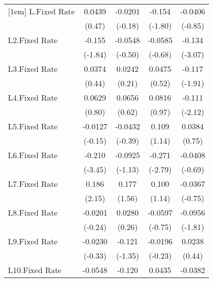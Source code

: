 {\begin{longtable}{l*{4}{c}}
[1em]
L.Fixed Rate    &   0.0439         &  -0.0201         &   -0.154         &  -0.0406         \\
                &   (0.47)         &  (-0.18)         &  (-1.80)         &  (-0.85)         \\
[1em]
L2.Fixed Rate   &   -0.155         &  -0.0548         &  -0.0585         &   -0.134\sym{**} \\
                &  (-1.84)         &  (-0.50)         &  (-0.68)         &  (-3.07)         \\
[1em]
L3.Fixed Rate   &   0.0374         &   0.0242         &   0.0475         &   -0.117         \\
                &   (0.44)         &   (0.21)         &   (0.52)         &  (-1.91)         \\
[1em]
L4.Fixed Rate   &   0.0629         &   0.0656         &   0.0816         &   -0.111\sym{*}  \\
                &   (0.80)         &   (0.62)         &   (0.97)         &  (-2.12)         \\
[1em]
L5.Fixed Rate   &  -0.0127         &  -0.0432         &    0.109         &   0.0384         \\
                &  (-0.15)         &  (-0.39)         &   (1.14)         &   (0.75)         \\
[1em]
L6.Fixed Rate   &   -0.210\sym{***}&  -0.0925         &   -0.271\sym{**} &  -0.0408         \\
                &  (-3.45)         &  (-1.13)         &  (-2.79)         &  (-0.69)         \\
[1em]
L7.Fixed Rate   &    0.186\sym{*}  &    0.177         &    0.100         &  -0.0367         \\
                &   (2.15)         &   (1.56)         &   (1.14)         &  (-0.75)         \\
[1em]
L8.Fixed Rate   &  -0.0201         &   0.0280         &  -0.0597         &  -0.0956         \\
                &  (-0.24)         &   (0.26)         &  (-0.75)         &  (-1.81)         \\
[1em]
L9.Fixed Rate   &  -0.0230         &   -0.121         &  -0.0196         &   0.0238         \\
                &  (-0.33)         &  (-1.35)         &  (-0.23)         &   (0.44)         \\
[1em]
L10.Fixed Rate  &  -0.0548         &   -0.120         &   0.0435         &  -0.0382         \\

\end{longtable}}
